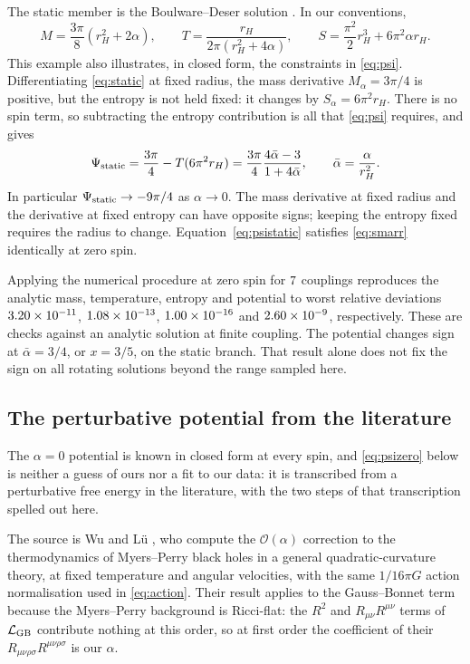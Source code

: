 \documentclass[11pt,a4paper]{article}
\begin{document}
The static member is the Boulware--Deser solution \cite{Boulware:1985wk}.
In our conventions,
\begin{equation}
 M=\frac{3\pi}{8}(r_H^2+2\alpha),\qquad
 T=\frac{r_H}{2\pi(r_H^2+4\alpha)},\qquad
 S=\frac{\pi^2}{2}r_H^3+6\pi^2\alpha r_H.
 \label{eq:static}
\end{equation}
This example also illustrates, in closed form, the constraints in
\eqref{eq:psi}. Differentiating \eqref{eq:static} at fixed radius, the mass
derivative $M_\alpha=3\pi/4$ is positive, but the entropy is not held fixed:
it changes by $S_\alpha=6\pi^2r_H$. There is no spin term, so subtracting the
entropy contribution is all that \eqref{eq:psi} requires, and gives
\begin{equation}
 \Psi_{\rm static}
 =\frac{3\pi}{4}-T(6\pi^2r_H)
 =\frac{3\pi}{4}\frac{4\bar\alpha-3}{1+4\bar\alpha},
 \qquad \bar\alpha=\frac\alpha{r_H^2}.
 \label{eq:psistatic}
\end{equation}
In particular $\Psi_{\rm static}\to-9\pi/4$ as $\alpha\to0$.
The mass derivative at fixed radius and the derivative at fixed entropy
can have opposite signs; keeping the entropy fixed requires the radius
to change. Equation~\eqref{eq:psistatic} satisfies \eqref{eq:smarr}
identically at zero spin.

Applying the numerical procedure at zero spin for $7$
couplings reproduces the analytic mass, temperature, entropy and
potential to worst relative deviations $3.20\times 10^{-11}$,
$1.08\times 10^{-13}$, $1.00\times 10^{-16}$ and $2.60\times 10^{-9}$,
respectively. These are checks against an analytic solution at finite
coupling. The potential changes sign at $\bar\alpha=3/4$, or $x=3/5$,
on the static branch. That result alone does not fix the sign on
all rotating solutions beyond the range sampled here.

\subsection{The perturbative potential from the literature}
\label{sec:perturbative}

The $\alpha=0$ potential is known in closed form at every spin, and
\eqref{eq:psizero} below is neither a guess of ours nor a fit to our data: it
is transcribed from a perturbative free energy in the literature, with the two
steps of that transcription spelled out here.

The source is Wu and L\"u \cite{Wu:2024xnb}, who compute the
$\mathcal O(\alpha)$ correction to the thermodynamics of Myers--Perry black
holes in a general quadratic-curvature theory, at fixed temperature and
angular velocities, with the same $1/16\pi G$ action normalisation used in
\eqref{eq:action}. Their result applies to the Gauss--Bonnet term because the
Myers--Perry background is Ricci-flat: the $R^2$ and $R_{\mu\nu}R^{\mu\nu}$
terms of $\mathcal L_{\mathrm{GB}}$ contribute nothing at this order, so at first order
the coefficient of their $R_{\mu\nu\rho\sigma}R^{\mu\nu\rho\sigma}$ is our
$\alpha$.
\end{document}
